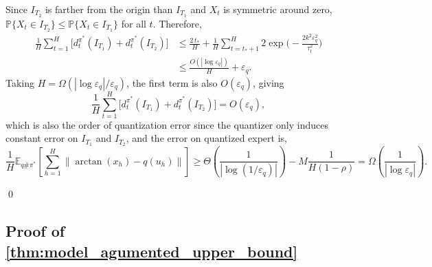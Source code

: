 \documentclass{article}
\begin{document}
Since $I_{T_2}$ is farther from the origin than $I_{T_1}$ and $X_t$ is symmetric around zero, $\mathbb P\{X_t\in I_{T_2}\}\le \mathbb P\{X_t\in I_{T_1}\}$ for all $t$.
Therefore,
\begin{align*}
\frac{1}{H}\sum_{t=1}^H\big[d_t^{\pi^*}(I_{T_1})+d_t^{\pi^*}(I_{T_2})\big]
&\le \frac{2\,t_*}{H}+\frac{1}{H}\sum_{t=t_*+1}^{H}2\exp\Big(-\frac{2k^2\varepsilon_q^2}{\tau_t^2}\Big)\\
&\le \frac{O(|\log\varepsilon_q|)}{H}+\varepsilon_q.
\end{align*}
Taking $H=\Omega(|\log\varepsilon_q|/\varepsilon_q)$, the first term is also $O(\varepsilon_q)$, giving
\begin{equation*}
    \frac{1}{H}\sum_{t=1}^H\big[d_t^{\pi^*}(I_{T_1})+d_t^{\pi^*}(I_{T_2})\big]=O(\varepsilon_q),
\end{equation*}
which is also the order of quantization error since the quantizer only induces constant error on $I_{T_1}$ and $I_{T_2}$, and the error on quantized expert is,
\begin{equation*}
    \frac{1}{H}\mathbb E_{q\#\pi^*}\left[\sum_{h=1}^H \|\arctan(x_h)-q(u_h)\|\right]\geq \Theta(\frac{1}{|\log(1/\varepsilon_q)|}) - M\frac{1}{H(1-\rho)}=\Omega(\frac{1}{|\log\varepsilon_q|}).
\end{equation*} 








\qed



\subsection{Proof of \texorpdfstring{\cref{thm:model_agumented_upper_bound}}{Theorem 7}}
\end{document}
